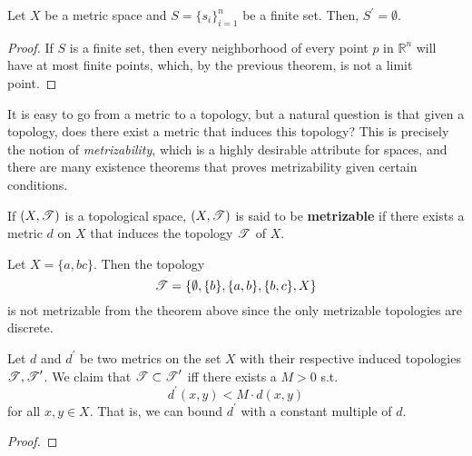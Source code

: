   \begin{corollary}
    Let $X$ be a metric space and $S = \{s_i\}_{i=1}^n$ be a finite set. Then, $S^\prime = \emptyset$.  
  \end{corollary}
  \begin{proof}
    If $S$ is a finite set, then every neighborhood of every point $p$ in $\mathbb{R}^n$ will have at most finite points, which, by the previous theorem, is not a limit point. 
  \end{proof}


  It is easy to go from a metric to a topology, but a natural question is that given a topology, does there exist a metric that induces this topology? This is precisely the notion of \textit{metrizability}, which is a highly desirable attribute for spaces, and there are many existence theorems that proves metrizability given certain conditions.

  \begin{definition}
    If $(X, \T)$ is a topological space, $(X, \T)$ is said to be \textbf{metrizable} if there exists a metric $d$ on $X$ that induces the topology $\T$ of $X$.
  \end{definition}

  \begin{example}
    Let $X = \{a, b c\}$. Then the topology 
    \begin{equation}
      \T = \{\emptyset, \{b\}, \{a, b\}, \{b, c\}, X \}
    \end{equation} 
    is not metrizable from the theorem above since the only metrizable topologies are discrete. 
  \end{example}

  \begin{lemma}
    Let $d$ and $d^\prime$ be two metrics on the set $X$ with their respective induced topologies $\T, \T^\prime$. We claim that $\T \subset \T^\prime$ iff there exists a $M > 0$ s.t. 
    \begin{equation}
      d^\prime (x, y) < M \cdot d(x, y)
    \end{equation} 
    for all $x, y \in X$. That is, we can bound $d^\prime$ with a constant multiple of $d$. 
  \end{lemma}
  \begin{proof}
    
  \end{proof}

